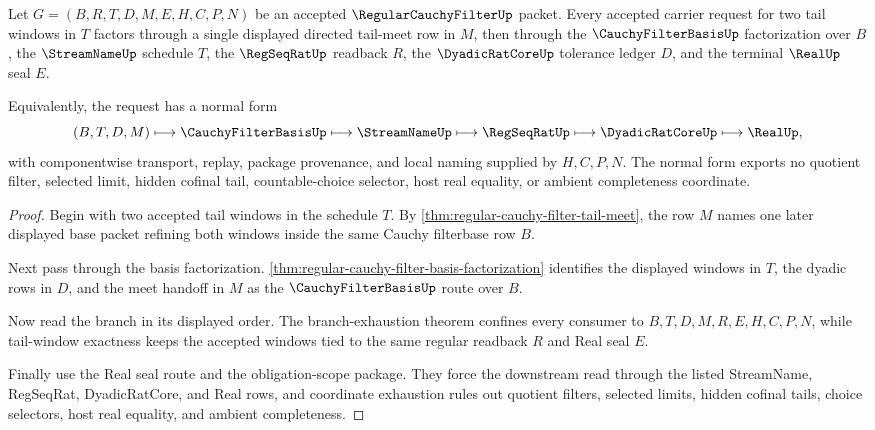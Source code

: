 \begin{theorem}
\label{thm:regular-cauchy-filter-directed-refinement-normal-form}
Let $G=(B,R,T,D,M,E,H,C,P,N)$ be an accepted $\RegularCauchyFilterUp$ packet. Every accepted carrier request for two tail windows in $T$ factors through a single displayed directed tail-meet row in $M$, then through the $\CauchyFilterBasisUp$ factorization over $B$, the $\StreamNameUp$ schedule $T$, the $\RegSeqRatUp$ readback $R$, the $\DyadicRatCoreUp$ tolerance ledger $D$, and the terminal $\RealUp$ seal $E$.

Equivalently, the request has a normal form
$$
(B,T,D,M) \longmapsto \CauchyFilterBasisUp \longmapsto \StreamNameUp \longmapsto \RegSeqRatUp \longmapsto \DyadicRatCoreUp \longmapsto \RealUp ,
$$
with componentwise transport, replay, package provenance, and local naming supplied by $H,C,P,N$. The normal form exports no quotient filter, selected limit, hidden cofinal tail, countable-choice selector, host real equality, or ambient completeness coordinate.
\end{theorem}
\begin{proof}
Begin with two accepted tail windows in the schedule $T$. By \autoref{thm:regular-cauchy-filter-tail-meet}, the row $M$ names one later displayed base packet refining both windows inside the same Cauchy filterbase row $B$.

Next pass through the basis factorization. \autoref{thm:regular-cauchy-filter-basis-factorization} identifies the displayed windows in $T$, the dyadic rows in $D$, and the meet handoff in $M$ as the $\CauchyFilterBasisUp$ route over $B$.

Now read the branch in its displayed order. The branch-exhaustion theorem confines every consumer to $B,T,D,M,R,E,H,C,P,N$, while tail-window exactness keeps the accepted windows tied to the same regular readback $R$ and Real seal $E$.

Finally use the Real seal route and the obligation-scope package. They force the downstream read through the listed StreamName, RegSeqRat, DyadicRatCore, and Real rows, and coordinate exhaustion rules out quotient filters, selected limits, hidden cofinal tails, choice selectors, host real equality, and ambient completeness.
\end{proof}

